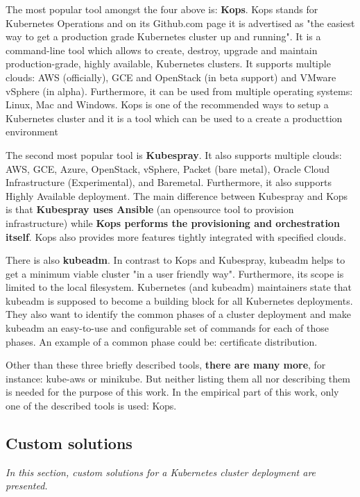 The most popular tool amongst the four above is: \textbf{Kops}. Kops stands for Kubernetes Operations and on its Github.com page it is advertised as "the easiest way to get a production grade Kubernetes cluster up and running"\cite{online-kops-gh}. It is a command-line tool which allows to create, destroy, upgrade and maintain production-grade, highly available, Kubernetes clusters. It supports multiple clouds: AWS (officially), GCE and OpenStack (in beta support) and VMware vSphere (in alpha)\cite{online-kops-gh}. Furthermore, it can be used from multiple operating systems: Linux, Mac and Windows\cite{online-kops-install}. Kops is one of the recommended ways to setup a Kubernetes cluster and it is a tool which can be used to a create a producttion environment\cite{book-devops-with-k8s}

The second most popular tool is \textbf{Kubespray}. It also supports multiple clouds: AWS, GCE, Azure, OpenStack, vSphere, Packet (bare metal), Oracle Cloud Infrastructure (Experimental), and Baremetal\cite{online-ks}. Furthermore, it also supports Highly Available deployment. The main difference between Kubespray and Kops is that \textbf{Kubespray uses Ansible} (an opensource tool to provision infrastructure) while \textbf{Kops performs the provisioning and orchestration itself}. Kops also provides more features tightly integrated with specified clouds\cite{online-ks-comp}.

There is also \textbf{kubeadm}. In contrast to Kops and Kubespray, kubeadm helps to get a minimum viable cluster "in a user friendly way". Furthermore, its scope is limited to the local filesystem\cite{online-kubeadm}. Kubernetes (and kubeadm) maintainers state that kubeadm is supposed to become a building block for all Kubernetes deployments. They also want to identify the common phases of a cluster deployment and make kubeadm an easy-to-use and configurable set of commands for each of those phases. An example of a common phase could be: certificate distribution\cite{kubeadm-vision-2017}.

Other than these three briefly described tools, \textbf{there are many more}, for instance: kube-aws\cite{kube-aws} or minikube\cite{minikube}. But neither listing them all nor describing them is needed for the purpose of this work. In the empirical part of this work, only one of the described tools is used: Kops.

\subsection{Custom solutions}
\textit{In this section, custom solutions for a Kubernetes cluster deployment are presented.}
\\

